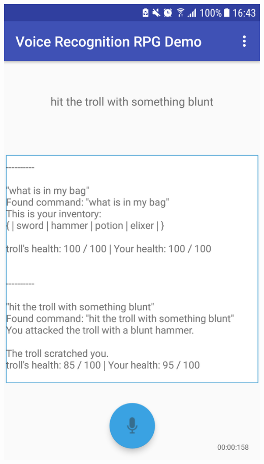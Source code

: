 \documentclass[11pt]{article}
\begin{document}
\begin{center}
\includegraphics[scale=0.18]{battle-2.png}
\newpage

\end{center}
\end{document}
